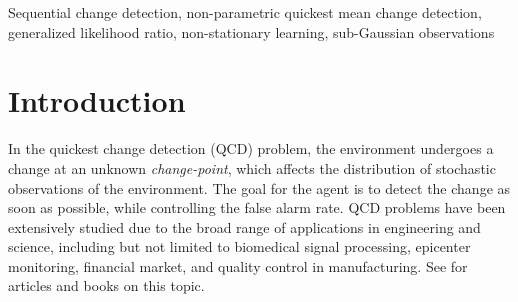 \documentclass[12pt]{interact}
\theoremstyle{plain}
\begin{document}
\begin{keywords}
Sequential change detection, non-parametric quickest mean change detection,  generalized likelihood ratio, non-stationary learning, sub-Gaussian observations
\end{keywords}

\section{Introduction}
\label{sec:Intro}


In the quickest change detection (QCD) problem, the environment undergoes a change at an unknown \emph{change-point}, which affects the  distribution of stochastic observations of the environment. 
The goal for the agent is to detect the change as soon as possible, while controlling the false alarm rate. 
QCD problems have been extensively studied due to the broad range of applications in engineering and science, including but not limited to biomedical signal processing, epicenter monitoring, financial market, and quality control in manufacturing. See \citep{poor-hadj-qcd-book-2009, vvv_qcd_overview, tart-niki-bass-2014, xie_vvv_qcd_overview} for articles and books on this topic.
\end{document}

